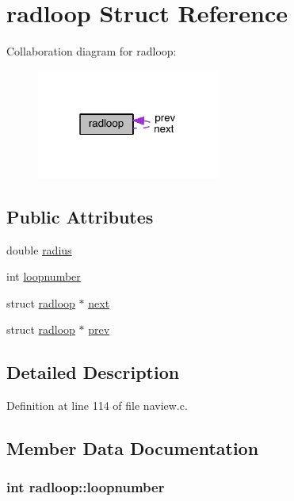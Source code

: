 \hypertarget{structradloop}{\section{radloop Struct Reference}
\label{structradloop}
}


Collaboration diagram for radloop\+:
\nopagebreak
\begin{figure}[H]
\begin{center}
\leavevmode
\includegraphics[width=171pt]{structradloop__coll__graph}
\end{center}
\end{figure}
\subsection*{Public Attributes}
\begin{DoxyCompactItemize}
\item 
double \hyperlink{structradloop_ae48cb0dfffdc71d27f415e7cfa5c6686}{radius}
\item 
int \hyperlink{structradloop_adefa8966693107c10ddee0d908eba5b0}{loopnumber}
\item 
struct \hyperlink{structradloop}{radloop} $\ast$ \hyperlink{structradloop_a07f6e1a0e19e5a7e03a9e831e8300d37}{next}
\item 
struct \hyperlink{structradloop}{radloop} $\ast$ \hyperlink{structradloop_acdcfc14a34e3316c6ecc01efcf5a8e46}{prev}
\end{DoxyCompactItemize}


\subsection{Detailed Description}


Definition at line 114 of file naview.\+c.



\subsection{Member Data Documentation}
\hypertarget{structradloop_adefa8966693107c10ddee0d908eba5b0}{
\subsubsection[{loopnumber}]{\setlength{\rightskip}{0pt plus 5cm}int radloop\+::loopnumber}}\label{structradloop_adefa8966693107c10ddee0d908eba5b0}


